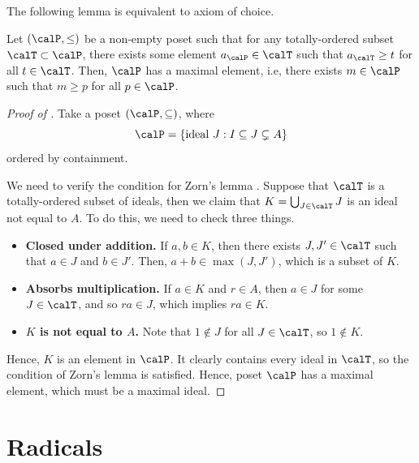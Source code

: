 The following lemma is equivalent to axiom of choice.
\begin{lemma}
    \label{lem:zorn}
    Let $(\calP,\leq)$ be a non-empty poset such that
    for any totally-ordered subset $\calT\subset \calP$,
    there exists some element $a_\calP\in \calT$
    such that $a_\calT\geq t$ for all $t\in \calT$.
    Then, $\calP$ has a maximal element,
    i.e, there exists $m\in \calP$ such that $m\geq p$
    for all $p\in \calP$.
\end{lemma}
\begin{proof}[Proof of ]
    Take a poset $(\calP, \subseteq)$, where
    $$\calP = \{\text{ideal } J : I\subseteq J\subsetneq A\}$$
    ordered by containment.
    
    We need to verify the condition for Zorn's lemma
    .
    Suppose that $\calT$
    is a totally-ordered subset of ideals,
    then we claim that $K = \bigcup_{J\in \calT} J$ is an ideal
    not equal to $A$. To do this, we need to check three things.
    \begin{itemize}
    \item \textbf{Closed under addition.}
    If $a,b\in K$, then there exists $J, J'\in\calT$
    such that $a\in J$ and $b\in J'$.
    Then, $a+b\in \max(J,J')$, which is a subset of $K$.
    \item \textbf{Absorbs multiplication.}
    If $a\in K$ and $r\in A$,
    then $a\in J$ for some $J\in \calT$,
    and so $ra\in J$, which implies $ra\in K$.
    \item \textbf{$K$ is not equal to $A$.}
    Note that $1\notin J$ for all $J\in \calT$,
    so $1\notin K$. 
    \end{itemize}
    Hence, $K$ is an element in $\calP$.
    It clearly contains every ideal in $\calT$,
    so the condition of Zorn's lemma is satisfied.
    Hence, poset $\calP$ has a maximal element,
    which must be a maximal ideal.
\end{proof}%
%
%
%
%
%
\section{Radicals}
\label{sec:radicals}
